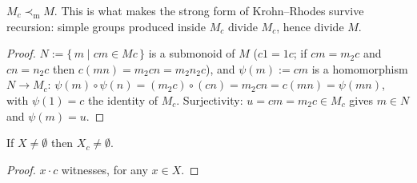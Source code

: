 \begin{lemma}[Division]\label{lem:localdiv-divides}
  \leanok
  $M_c \prec_{\mathrm m} M$. This is what makes the strong form of Krohn--Rhodes
  survive recursion: simple groups produced inside $M_c$ divide $M_c$,
  hence divide $M$.
\end{lemma}
\begin{proof}
  \leanok
  $N := \{\, m \mid cm \in Mc \,\}$ is a submonoid of $M$
  ($c1 = 1c$; if $cm = m_2 c$ and $cn = n_2 c$ then
  $c(mn) = m_2 c n = m_2 n_2 c$), and $\psi(m) := cm$ is a
  homomorphism $N \to M_c$: $\psi(m)\circ\psi(n) = (m_2 c)\circ(cn)
  = m_2 c n = c(mn) = \psi(mn)$, with $\psi(1) = c$ the identity of
  $M_c$. Surjectivity: $u = cm = m_2 c \in M_c$ gives $m \in N$ and
  $\psi(m) = u$.
\end{proof}

\begin{lemma}\label{lem:localdiv-nonempty}
  \leanok
  If $X \neq \emptyset$ then $X_c \neq \emptyset$.
\end{lemma}
\begin{proof}
  \leanok
  $x \cdot c$ witnesses, for any $x \in X$.
\end{proof}
